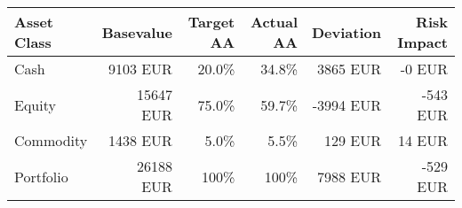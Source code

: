 \center
\label{table_port_aa}
\begin{tabular}{l|r|r|r|r|r}
Asset Class & Basevalue & Target AA & Actual AA & Deviation & Risk Impact\\\hline\hline
Cash &      9103 EUR & 20.0\% & 34.8\% &      3865 EUR &        -0  EUR\\
Equity &     15647 EUR & 75.0\% & 59.7\% &     -3994 EUR &      -543  EUR\\
Commodity &      1438 EUR & 5.0\% & 5.5\% &       129 EUR &        14  EUR\\
\hline Portfolio &     26188 EUR & 100\% & 100\% &       7988 EUR &      -529  EUR\\\hline
\end{tabular}
